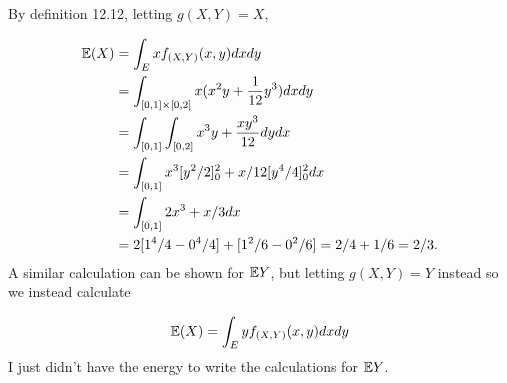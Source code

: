 
By definition 12.12, letting $ g(X,Y) = X$,


\begin{align*}
    \mathbb{E}(X) &= \int_{E} x f_{(X,Y)} (x,y) dx dy\\
	  &= \int_{[0,1]\times [0,2]} x ( x^2 y + \frac{1}{12} y^{3} )dx dy\\
	  &= \int_{[0,1]} \int_{[0,2]} x^{3} y + \frac{xy^{3} }{12}  dy dx\\
	  &= \int_{[0,1]}  x^{3} [y^2/2]_{0}^{2} + x/12 [y^{4}/4]_{0}^{2} dx\\
	  &= \int_{[0,1]} 2x^{3} + x/3 dx \\
	  &= 2 [1^{4}/4 - 0^{4}/4] + [1^2/6 - 0^2/6] = 2/4 + 1/6 = 2/3. 
\end{align*}
A similar calculation can be shown for $ \mathbb{E} Y$, but letting $ g(X,Y) = Y$ instead so we instead
calculate 

\[
    \mathbb{E}(X) = \int_{E} y f_{(X,Y)} (x,y) dx dy
\] 
I just didn't have the energy to write the calculations for $ \mathbb{E} Y$. 

